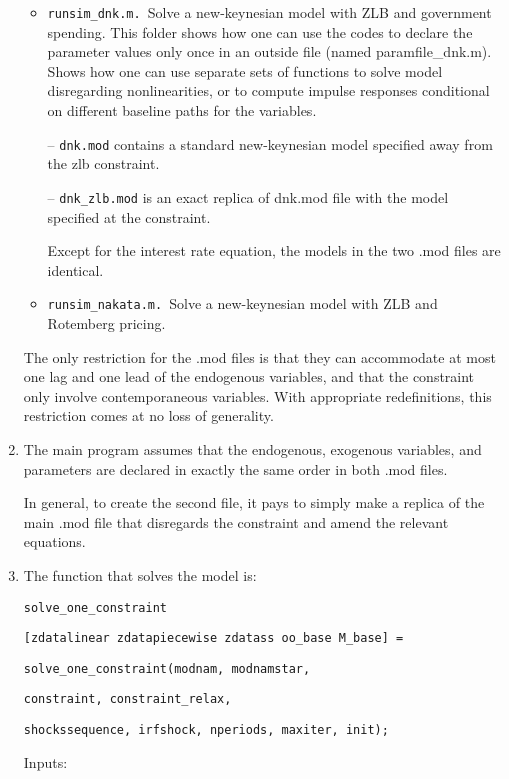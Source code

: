\documentclass[12pt]{article}
\begin{document}
\begin{enumerate}
\begin{itemize}
\item \texttt{runsim\_dnk.m. }Solve a new-keynesian model with ZLB and
government spending. This folder shows how one can use the codes to declare
the parameter values only once in an outside file (named paramfile\_dnk.m).
Shows how one can use separate sets of functions to solve model disregarding
nonlinearities, or to compute impulse responses conditional on different
baseline paths for the variables.

-- \texttt{dnk.mod} contains a standard new-keynesian model specified away
from the zlb constraint.

-- \texttt{dnk\_zlb.mod} is an exact replica of dnk.mod file with the model
specified at the constraint.

Except for the interest rate equation, the models in the two .mod files are
identical.

\item \texttt{runsim\_nakata.m. }Solve a new-keynesian model with ZLB and
Rotemberg pricing.
\end{itemize}

The only restriction for the .mod files is that they can accommodate at most
one lag and one lead of the endogenous variables, and that the constraint
only involve contemporaneous variables. With appropriate redefinitions, this
restriction comes at no loss of generality.

\item The main program assumes that the endogenous, exogenous variables, and
parameters are declared in exactly the same order in both .mod files.

In general, to create the second file, it pays to simply make a replica of
the main .mod file that disregards the constraint and amend the relevant
equations.

\medskip

\item The function that solves the model is:

\texttt{solve\_one\_constraint}

\texttt{[zdatalinear zdatapiecewise zdatass oo\_base M\_base] = }

\texttt{solve\_one\_constraint(modnam, modnamstar, }

\texttt{constraint, constraint\_relax, }

\texttt{shockssequence, irfshock, nperiods, maxiter, init);}

\medskip

Inputs:


\end{enumerate}
\end{document}
